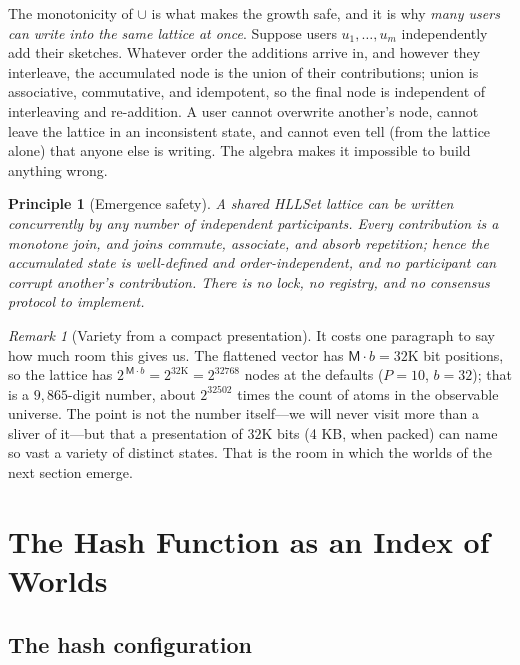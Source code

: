 \documentclass[11pt,a4paper]{article}
\newtheorem{principle}{Principle}[section]
\theoremstyle{remark}
\newtheorem{remark}[theorem]{Remark}
\newcommand{\Reg}{\ensuremath{\mathsf{M}}}          %
\newcommand{\Prec}{\ensuremath{P}}                  %
\newcommand{\Bits}{\ensuremath{b}}                  %
\begin{document}
The monotonicity of $\cup$ is what makes the growth safe, and it is why
\emph{many users can write into the same lattice at once}. Suppose users
$u_1,\dots,u_m$ independently add their sketches. Whatever order the additions
arrive in, and however they interleave, the accumulated node is the union of
their contributions; union is associative, commutative, and idempotent, so the
final node is independent of interleaving and re-addition. A user cannot
overwrite another's node, cannot leave the lattice in an inconsistent state,
and cannot even tell (from the lattice alone) that anyone else is writing. The
algebra makes it impossible to build anything wrong.

\begin{principle}[Emergence safety]
\label{prin:emergence}
A shared HLLSet lattice can be written concurrently by any number of
independent participants. Every contribution is a monotone join, and joins
commute, associate, and absorb repetition; hence the accumulated state is
well-defined and order-independent, and no participant can corrupt another's
contribution. There is no lock, no registry, and no consensus protocol to
implement.
\end{principle}

\begin{remark}[Variety from a compact presentation]
It costs one paragraph to say how much room this gives us. The flattened vector
has $\Reg\cdot\Bits = 32\mathrm{K}$ bit positions, so the lattice has
$2^{\,\Reg\cdot\Bits} = 2^{32\mathrm{K}} = 2^{32768}$ nodes at the defaults
($\Prec=10$, $\Bits=32$); that is a $9{,}865$-digit number, about $2^{32502}$
times the count of atoms in the observable universe. The point is not the
number itself---we will never visit more than a sliver of it---but that a
presentation of $32\mathrm{K}$ bits (4 KB, when packed) can name so vast a
variety of distinct states. That is the room in which the worlds of the next
section emerge.
\end{remark}

\section{The Hash Function as an Index of Worlds}
\label{sec:worlds}

\subsection{The hash configuration}
\end{document}
